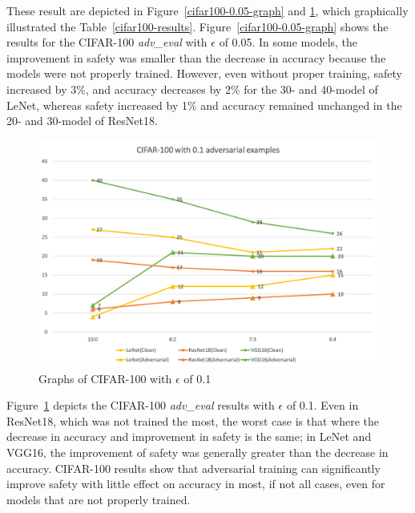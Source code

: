 \documentclass[journal,article,submit,moreauthors,pdftex]{Definitions/mdpi}
\begin{document}
These result are depicted in Figure~\ref{cifar100-0.05-graph} and \ref{cifar100-0.1-graph}, which graphically illustrated the Table~\ref{cifar100-results}.
Figure~\ref{cifar100-0.05-graph} shows the results for the CIFAR-100 {\it adv\_eval} with \begin{math}\epsilon\end{math} of 0.05.
In some models, the improvement in safety was smaller than the decrease in accuracy because the models were not properly trained.
However, even without proper training, safety increased by 3\%, and accuracy decreases by 2\% for the 30- and 40-model of LeNet,
whereas safety increased by 1\% and accuracy remained unchanged in the 20- and 30-model of ResNet18.

\begin{figure}[H]
    \includegraphics[width=13 cm]{Definitions/graph-01cifar100.png}
    \caption{Graphs of CIFAR-100 with \begin{math}\epsilon\end{math} of 0.1\label{cifar100-0.1-graph}}
\end{figure} 

Figure~\ref{cifar100-0.1-graph} depicts the CIFAR-100 {\it adv\_eval} results with \begin{math}\epsilon\end{math} of 0.1.
Even in ResNet18, which was not trained the most, the worst case is that where the decrease in accuracy and improvement in safety is the same;
in LeNet and VGG16, the improvement of safety was generally greater than the decrease in accuracy.
CIFAR-100 results show that adversarial training can significantly improve safety with little effect on accuracy in most, if not all cases, even for models that are not properly trained.
\end{document}
